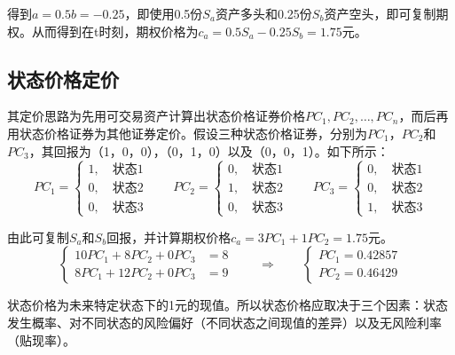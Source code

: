 \documentclass[11pt]{article}
\begin{document}
得到$a=0.5 b=-0.25$，即使用0.5份$S_a$资产多头和0.25份$S_b$资产空头，即可复制期权。从而得到在t时刻，期权价格为$c_a=0.5S_a-0.25S_b=1.75$元。

\subsection{状态价格定价}

其定价思路为先用可交易资产计算出状态价格证券价格$PC_1,PC_2,\ldots,PC_n$，而后再用状态价格证券为其他证券定价。假设三种状态价格证券，分别为$PC_1$，$PC_2$和$PC_3$，其回报为（1，0，0），（0，1，0）以及（0，0，1）。如下所示：
\begin{equation*}
PC_1 = 
\left\{
\begin{aligned}
1, \quad \text{状态1} \\
0, \quad \text{状态2} \\
0, \quad \text{状态3} 
\end{aligned}\right.
\qquad
PC_2 = 
\left\{
\begin{aligned}
0, \quad \text{状态1} \\
1, \quad \text{状态2} \\
0, \quad \text{状态3} 
\end{aligned}\right.
\qquad
PC_3 = 
\left\{
\begin{aligned}
0, \quad \text{状态1} \\
0, \quad \text{状态2} \\
1, \quad \text{状态3} 
\end{aligned}\right.
\end{equation*}

由此可复制$S_a$和$S_b$回报，并计算期权价格$c_a=3 PC_{1} + 1 PC_2 =1.75$元。
\begin{equation*}
  \left\{
    \begin{aligned}
    10PC_1+8PC_2+0PC_3&=8 \\
    8PC_1+12PC_2+0PC_3&=9
    \end{aligned}
  \right.
  \qquad
  \Rightarrow
  \qquad
  \left\{
    \begin{aligned}
    PC_1 = 0.42857\\
    PC_2 = 0.46429
    \end{aligned}
  \right.
\end{equation*}

状态价格为未来特定状态下的1元的现值。所以状态价格应取决于三个因素：状态发生概率、对不同状态的风险偏好（不同状态之间现值的差异）以及无风险利率（贴现率）。
\end{document}
